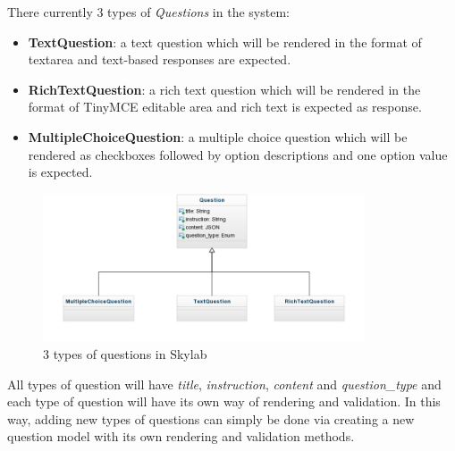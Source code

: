 There currently 3 types of \textit{Questions} in the system:

\begin{itemize}
  \item \textbf{TextQuestion}: a text question which will be rendered in the format of textarea and text-based responses are expected. 
  \item \textbf{RichTextQuestion}: a rich text question which will be rendered in the format of TinyMCE editable area and rich text is expected as response.
  \item \textbf{MultipleChoiceQuestion}: a multiple choice question which will be rendered as checkboxes followed by option descriptions and one option value is expected.
\end{itemize}

\begin{figure}[h]
    \centering
    \includegraphics[width=0.85\textwidth]{Images/Skylab_Questions.jpg}
    \caption{3 types of questions in Skylab}
\end{figure}

All types of question will have \textit{title}, \textit{instruction}, \textit{content} and \textit{question\_type} and each type of question will have its own way of rendering and validation. In this way, adding new types of questions can simply be done via creating a new question model with its own rendering and validation methods.
